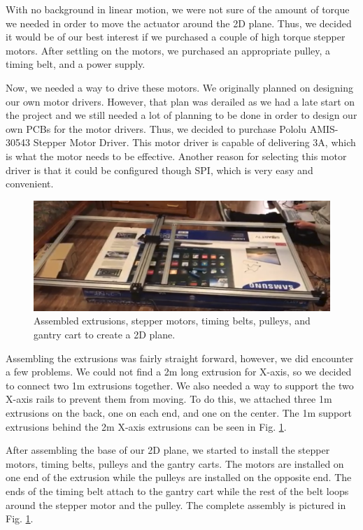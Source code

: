 \documentclass[11pt]{IEEEtran}
\begin{document}
With no background in linear motion, we were not sure of the amount of torque we needed in order to move the actuator around the 2D plane. Thus, we decided it would be of our best interest if we purchased a couple of high torque stepper motors. After settling on the motors, we purchased an appropriate pulley, a timing belt, and a power supply.

Now, we needed a way to drive these motors. We originally planned on designing our own motor drivers. However, that plan was derailed as we had a late start on the project and we still needed a lot of planning to be done in order to design our own PCBs for the motor drivers. Thus, we decided to purchase Pololu AMIS-30543 Stepper Motor Driver. This motor driver is capable of delivering 3A, which is what the motor needs to be effective. Another reason for selecting this motor driver is that it could be configured though SPI, which is very easy and convenient.  

\begin{figure}[H]
  \centering
  \includegraphics[width=\columnwidth]{image2.png}
  \caption{Assembled extrusions, stepper motors, timing belts, pulleys, and gantry cart to create a 2D plane.}
  \label{fig:lineartracks}
\end{figure}

Assembling the extrusions was fairly straight forward, however, we did encounter a few problems. We could not find a 2m long extrusion for X-axis, so we decided to connect two 1m extrusions together. We also needed a way to support the two X-axis rails to prevent them from moving. To do this, we attached three 1m extrusions on the back, one on each end, and one on the center. The 1m support extrusions behind the 2m X-axis extrusions can be seen in Fig. \ref{fig:lineartracks}.

After assembling the base of our 2D plane, we started to install the stepper motors, timing belts, pulleys and the gantry carts. The motors are installed on one end of the extrusion while the pulleys are installed on the opposite end. The ends of the timing belt attach to the gantry cart while the rest of the belt loops around the stepper motor and the pulley. The complete assembly is pictured in Fig. \ref{fig:lineartracks}.
\end{document}
